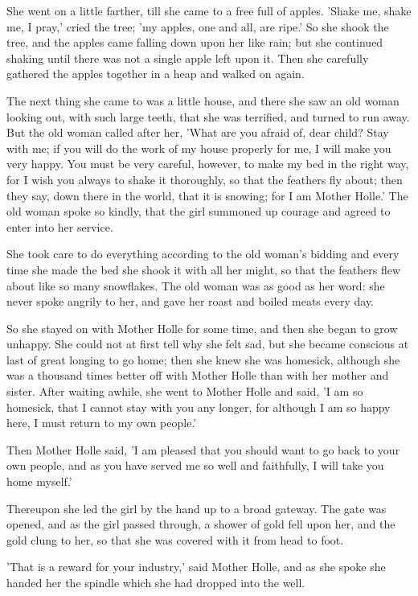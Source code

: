 \documentclass[12pt]{book}
\begin{document}
She went on a little farther, till she came to a free full of apples.
'Shake me, shake me, I pray,' cried the tree; 'my apples, one and all,
are ripe.' So she shook the tree, and the apples came falling down
upon her like rain; but she continued shaking until there was not a
single apple left upon it. Then she carefully gathered the apples
together in a heap and walked on again.

The next thing she came to was a little house, and there she saw an
old woman looking out, with such large teeth, that she was terrified,
and turned to run away. But the old woman called after her, 'What are
you afraid of, dear child? Stay with me; if you will do the work of my
house properly for me, I will make you very happy. You must be very
careful, however, to make my bed in the right way, for I wish you
always to shake it thoroughly, so that the feathers fly about; then
they say, down there in the world, that it is snowing; for I am Mother
Holle.' The old woman spoke so kindly, that the girl summoned up
courage and agreed to enter into her service.

She took care to do everything according to the old woman's bidding
and every time she made the bed she shook it with all her might, so
that the feathers flew about like so many snowflakes. The old woman
was as good as her word: she never spoke angrily to her, and gave her
roast and boiled meats every day.

So she stayed on with Mother Holle for some time, and then she began
to grow unhappy. She could not at first tell why she felt sad, but she
became conscious at last of great longing to go home; then she knew
she was homesick, although she was a thousand times better off with
Mother Holle than with her mother and sister. After waiting awhile,
she went to Mother Holle and said, 'I am so homesick, that I cannot
stay with you any longer, for although I am so happy here, I must
return to my own people.'

Then Mother Holle said, 'I am pleased that you should want to go back
to your own people, and as you have served me so well and faithfully,
I will take you home myself.'

Thereupon she led the girl by the hand up to a broad gateway. The gate
was opened, and as the girl passed through, a shower of gold fell upon
her, and the gold clung to her, so that she was covered with it from
head to foot.

'That is a reward for your industry,' said Mother Holle, and as she
spoke she handed her the spindle which she had dropped into the well.
\end{document}
